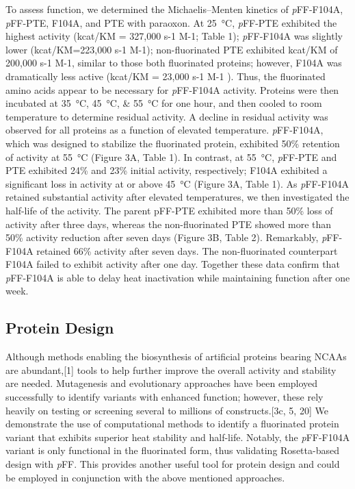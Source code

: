 \begin{refsection}
To assess function, we determined the Michaelis–Menten kinetics of
\emph{p}FF-F104A, \emph{p}FF-PTE, F104A, and PTE with paraoxon. At
\SI{25}{\celsius}, \emph{p}FF-PTE exhibited the highest activity (kcat/KM =
327,000 s-1 M-1; Table 1); \emph{p}FF-F104A was slightly lower (kcat/KM=223,000
s-1 M-1); non-fluorinated PTE exhibited kcat/KM of 200,000 s-1 M-1, similar to
those both fluorinated proteins; however, F104A was dramatically less active
(kcat/KM = 23,000 s-1 M-1 ). Thus, the fluorinated amino acids appear to be
necessary for \emph{p}FF-F104A activity. Proteins were then incubated at
\SIlist{35;45;55}{\celsius} for one hour, and then cooled to room temperature
to determine residual activity. A decline in residual activity was observed for
all proteins as a function of elevated temperature. \emph{p}FF-F104A, which was
designed to stabilize the fluorinated protein, exhibited 50\% retention of
activity at \SI{55}{\celsius} (Figure 3A, Table 1). In contrast, at
\SI{55}{\celsius}, \emph{p}FF-PTE and PTE exhibited 24\% and 23\% initial
activity, respectively; F104A exhibited a significant loss in activity at or
above \SI{45}{\celsius} (Figure 3A, Table 1). As \emph{p}FF-F104A retained
substantial activity after elevated temperatures, we then investigated the
half-life of the activity. The parent pFF-PTE exhibited more than 50\% loss of
activity after three days, whereas the non-fluorinated PTE showed more than
50\% activity reduction after seven days (Figure 3B, Table 2). Remarkably,
\emph{p}FF-F104A retained 66\% activity after seven days. The non-fluorinated
counterpart F104A failed to exhibit activity after one day. Together these data
confirm that \emph{p}FF-F104A is able to delay heat inactivation while
maintaining function after one week.

\subsection{Protein Design}

Although methods enabling the biosynthesis of artificial proteins bearing NCAAs
are abundant,[1] tools to help further improve the overall activity and
stability are needed. Mutagenesis and evolutionary approaches have been
employed successfully to identify variants with enhanced function; however,
these rely heavily on testing or screening several to millions of
constructs.[3c, 5, 20] We demonstrate the use of computational methods to
identify a fluorinated protein variant that exhibits superior heat stability
and half-life. Notably, the \emph{p}FF-F104A variant is only functional in the
fluorinated form, thus validating Rosetta-based design with \emph{p}FF. This
provides another useful tool for protein design and could be employed in
conjunction with the above mentioned approaches.

\printbibliography[heading=subbibliography]

\end{refsection}
